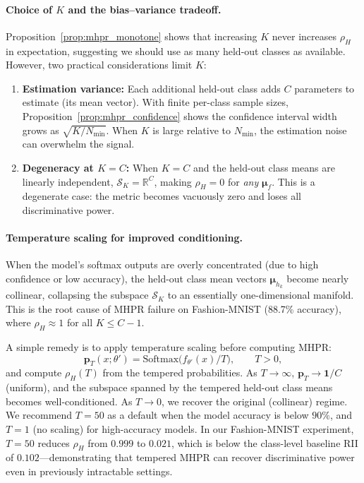 \documentclass[journal]{IEEEtran}
\theoremstyle{definition}
\begin{document}
\paragraph{Choice of $K$ and the bias--variance tradeoff.}
Proposition~\ref{prop:mhpr_monotone} shows that increasing $K$ never increases $\rho_H$ in expectation, suggesting we should use as many held-out classes as available. However, two practical considerations limit $K$:

\begin{enumerate}
\item \textbf{Estimation variance:} Each additional held-out class adds $C$ parameters to estimate (its mean vector). With finite per-class sample sizes, Proposition~\ref{prop:mhpr_confidence} shows the confidence interval width grows as $\sqrt{K/N_{\min}}$. When $K$ is large relative to $N_{\min}$, the estimation noise can overwhelm the signal.

\item \textbf{Degeneracy at $K = C$:} When $K = C$ and the held-out class means are linearly independent, $\mathcal{S}_K = \mathbb{R}^C$, making $\rho_H = 0$ for \emph{any} $\boldsymbol{\mu}_f$. This is a degenerate case: the metric becomes vacuously zero and loses all discriminative power.
\end{enumerate}

\paragraph{Temperature scaling for improved conditioning.}
When the model's softmax outputs are overly concentrated (due to high confidence or low accuracy), the held-out class mean vectors $\boldsymbol{\mu}_{h_k}$ become nearly collinear, collapsing the subspace $\mathcal{S}_K$ to an essentially one-dimensional manifold. This is the root cause of MHPR failure on Fashion-MNIST (88.7\% accuracy), where $\rho_H \approx 1$ for all $K \le C-1$.

A simple remedy is to apply temperature scaling before computing MHPR:
\begin{equation}
\mathbf{p}_T(x;\theta') = \mathrm{Softmax}\big(f_{\theta'}(x) / T\big), \qquad T > 0,
\end{equation}
and compute $\rho_H(T)$ from the tempered probabilities. As $T \to \infty$, $\mathbf{p}_T \to \mathbf{1}/C$ (uniform), and the subspace spanned by the tempered held-out class means becomes well-conditioned. As $T \to 0$, we recover the original (collinear) regime. We recommend $T = 50$ as a default when the model accuracy is below $90\%$, and $T = 1$ (no scaling) for high-accuracy models. In our Fashion-MNIST experiment, $T = 50$ reduces $\rho_H$ from $0.999$ to $0.021$, which is below the class-level baseline RII of $0.102$---demonstrating that tempered MHPR can recover discriminative power even in previously intractable settings.
\end{document}
